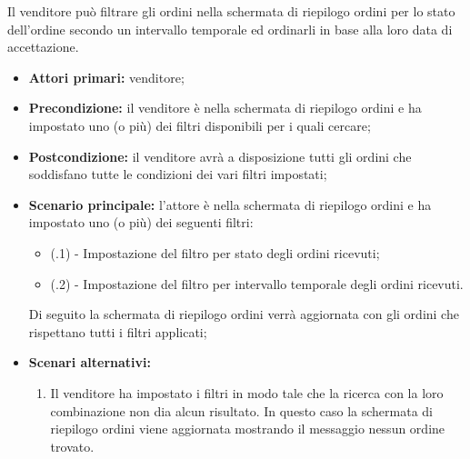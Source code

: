 Il venditore può filtrare gli ordini nella schermata di riepilogo ordini per lo stato dell'ordine secondo un intervallo temporale ed ordinarli in base alla loro data di accettazione.
\begin{itemize}
	\item \textbf{Attori primari:} venditore;
	\item \textbf{Precondizione:} il venditore è nella schermata di riepilogo ordini e ha impostato uno (o più) dei filtri disponibili per i quali cercare;
	\item \textbf{Postcondizione:} il venditore avrà a disposizione tutti gli ordini che soddisfano tutte le condizioni dei vari filtri impostati;
	\item \textbf{Scenario principale:} l'attore è nella schermata di riepilogo ordini e ha impostato uno (o più) dei seguenti filtri:
	\begin{itemize}
		\item (\actualUC.1) - Impostazione del filtro per stato degli ordini ricevuti;
		\item (\actualUC.2) - Impostazione del filtro per intervallo temporale degli ordini ricevuti.
	\end{itemize}
	Di seguito la schermata di riepilogo ordini verrà aggiornata con gli ordini che rispettano tutti i filtri applicati;
	\item \textbf{Scenari alternativi:}
	\begin{enumerate}[label=\lett]
		\item Il venditore ha impostato i filtri in modo tale che la ricerca con la loro combinazione non dia alcun risultato. In questo caso la schermata di riepilogo ordini viene aggiornata mostrando il messaggio nessun ordine trovato.
	\end{enumerate}
\end{itemize}

